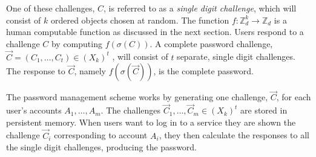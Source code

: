 \par One of these challenges, $C$, is referred to as a \emph{single digit challenge}, which will consist of $k$ ordered objects chosen at random. The function $f: \mathbb{Z}^k_d \rightarrow \mathbb{Z}_d$ is a human computable function as discussed in the next section. Users respond to a challenge $C$ by computing $f(\sigma(C))$. A complete password challenge, $\vec C = (C_1,\dots,C_t) \in (X_k)^t$ , will consist of $t$ separate, single digit challenges. The response to $\vec C$, namely $f(\sigma(\vec C))$, is the complete password. 
\par The password management scheme works by generating one challenge, $\vec C$, for each user's accounts $A_1,\dots,A_m$. The challenges $\vec C_1,\dots,\vec C_m \in (X_k)^t$ are stored in persistent memory. When users want to log in to a service they are shown the challenge $\vec C_i$ corresponding to account $A_i$, they then calculate the responses to all the single digit challenges, producing the password.

